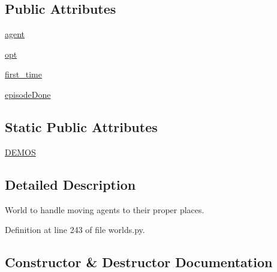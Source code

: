 \subsection*{Public Attributes}
\begin{DoxyCompactItemize}
\item 
\hyperlink{classparlai_1_1chat__service_1_1tasks_1_1overworld__demo_1_1worlds_1_1MessengerOverworld_a0466d551ecaa370b9cd4399d2df674de}{agent}
\item 
\hyperlink{classparlai_1_1chat__service_1_1tasks_1_1overworld__demo_1_1worlds_1_1MessengerOverworld_a56ded4b12c29ec7afe535fa465e2f060}{opt}
\item 
\hyperlink{classparlai_1_1chat__service_1_1tasks_1_1overworld__demo_1_1worlds_1_1MessengerOverworld_a8d15a01f05649c59054dd7983008876b}{first\+\_\+time}
\item 
\hyperlink{classparlai_1_1chat__service_1_1tasks_1_1overworld__demo_1_1worlds_1_1MessengerOverworld_a6770e1e0fb6d4ffcc595a15123dda18c}{episode\+Done}
\end{DoxyCompactItemize}
\subsection*{Static Public Attributes}
\begin{DoxyCompactItemize}
\item 
\hyperlink{classparlai_1_1chat__service_1_1tasks_1_1overworld__demo_1_1worlds_1_1MessengerOverworld_a0a63a6c3e68790ef8f773e9d6ca408fc}{D\+E\+M\+OS}
\end{DoxyCompactItemize}


\subsection{Detailed Description}
\begin{DoxyVerb}World to handle moving agents to their proper places.
\end{DoxyVerb}
 

Definition at line 243 of file worlds.\+py.



\subsection{Constructor \& Destructor Documentation}
\mbox{\label{classparlai_1_1chat__service_1_1tasks_1_1overworld__demo_1_1worlds_1_1MessengerOverworld_a8d781f73d10b44cf73c9127588747ff1}} 
